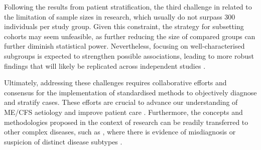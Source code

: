 Following the results from patient stratification, the third challenge in \cfs related to the limitation of sample sizes in research, which usually do not surpass 300 individuals per study group.
Given this constraint, the strategy for subsetting \cfs cohorts may seem unfeasible, as further reducing the size of compared groups can further diminish statistical power.
Nevertheless, focusing on well-characterised subgroups is expected to strengthen possible associations, leading to more robust findings that will likely be replicated across independent studies \citep{jason2005ChronicFatigue}.


Ultimately, addressing these challenges requires collaborative efforts and consensus for the implementation of standardised methods to objectively diagnose and stratify \cfs cases.
These efforts are crucial to advance our understanding of ME/CFS aetiology and improve patient care \citep{pheby2020DevelopmentConsistent, jason2023EstablishingConsensus}.
Furthermore, the concepts and methodologies proposed in the context of \cfs research can be readily transferred to other complex diseases, such as \LC, where there is evidence of misdiagnosis or suspicion of distinct disease subtypes \citep{zhang2023DatadrivenIdentification, woodrow2023SystematicReview}.




